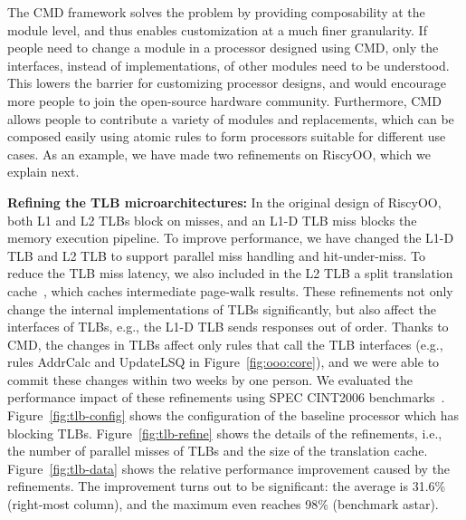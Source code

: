 \documentclass[conference]{IEEEtran}
\begin{document}
The CMD framework solves the problem by providing composability at the module level, and thus enables customization at a much finer granularity.
If people need to change a module in a processor designed using CMD, only the interfaces, instead of implementations, of other modules need to be understood.
This lowers the barrier for customizing processor designs, and would encourage more people to join the open-source hardware community.
Furthermore, CMD allows people to contribute a variety of modules and replacements, which can be composed easily using atomic rules to form processors suitable for different use cases.
As an example, we have made two refinements on RiscyOO, which we explain next.

\noindent\textbf{Refining the TLB microarchitectures:}
In the original design of RiscyOO, both L1 and L2 TLBs block on misses, and an L1-D TLB miss blocks the memory execution pipeline.
To improve performance, we have changed the L1-D TLB and L2 TLB to support parallel miss handling and hit-under-miss.
To reduce the TLB miss latency, we also included in the L2 TLB a split translation cache~\cite{translationCache}, which caches intermediate page-walk results.
These refinements not only change the internal implementations of TLBs significantly, but also affect the interfaces of TLBs, e.g., the L1-D TLB sends responses out of order.
Thanks to CMD, the changes in TLBs affect only rules that call the TLB interfaces (e.g., rules AddrCalc and UpdateLSQ in Figure~\ref{fig:ooo:core}), and we were able to commit these changes within two weeks by one person.
We evaluated the performance impact of these refinements using SPEC CINT2006 benchmarks~\cite{riscyoo}.
Figure~\ref{fig:tlb-config} shows the configuration of the baseline processor which has blocking TLBs.
Figure~\ref{fig:tlb-refine} shows the details of the refinements, i.e., the number of parallel misses of TLBs and the size of the translation cache.
Figure~\ref{fig:tlb-data} shows the relative performance improvement caused by the refinements.
The improvement turns out to be significant: the average is 31.6\% (right-most column), and the maximum even reaches 98\% (benchmark astar).

\end{document}
